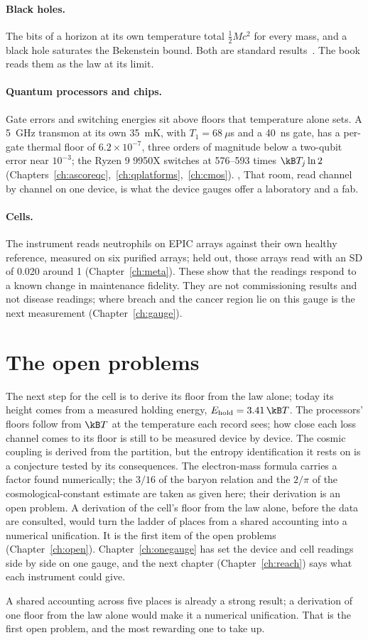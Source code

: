 \paragraph{Black holes.} The bits of a horizon at its own temperature total $\tfrac12Mc^2$ for every mass, and a black hole saturates the
Bekenstein bound. Both are standard results~\cite{Bekenstein1973,Hawking1975}. \derived{} The book reads them as the law at its limit. \interp

\paragraph{Quantum processors and chips.} Gate errors and switching energies sit above floors that temperature alone sets. A 5~GHz transmon
at its own 35~mK, with $T_1=68~\mu$s and a 40~ns gate, has a per-gate thermal floor of $6.2\times10^{-7}$, three orders of magnitude below a
two-qubit error near $10^{-3}$; the Ryzen 9 9950X switches at 576--593 times $\kB T_j\ln2$
(Chapters~\ref{ch:ascoreqc},~\ref{ch:qplatforms},~\ref{ch:cmos}). \derived, \calc{} That room, read channel by channel on one device, is what the
device gauges offer a laboratory and a fab.

\paragraph{Cells.} The instrument reads neutrophils on EPIC arrays against their own healthy reference, measured on six purified arrays; held out,
those arrays read with an SD of 0.020 around 1 (Chapter~\ref{ch:meta}). \calibrated
\measured{} These show that the readings respond to a known change in maintenance fidelity. They are not commissioning results and not disease
readings; where breach and the cancer region lie on this gauge is the next measurement (Chapter~\ref{ch:gauge}).

\section{The open problems}\label{sec:synth:notshown}
The next step for the cell is to derive its floor from the law alone; today its height comes from a measured holding energy, $E_{\rm hold}=3.41\,\kB T$. The processors' floors
follow from $\kB T$ at the temperature each record sees; how close each loss channel comes to its floor is still to be measured device by
device. The cosmic coupling is derived from the partition, but the entropy identification it rests on is a
conjecture tested by its consequences. The electron-mass formula carries a factor found numerically; the $3/16$ of the baryon relation and the
$2/\pi$ of the cosmological-constant estimate are taken as given here; their derivation is an open problem. A derivation of the cell's floor from the law alone, before the data are consulted, would
turn the ladder of places from a shared accounting into a numerical unification. It is the first item of the open problems
(Chapter~\ref{ch:open}). Chapter~\ref{ch:onegauge} has set the device and cell readings side by side on one gauge, and the next chapter
(Chapter~\ref{ch:reach}) says what each instrument could give.

A shared accounting across five places is already a strong result; a derivation of one floor from the law alone would make it a numerical unification. That is the first open problem, and the most rewarding one to take up.

